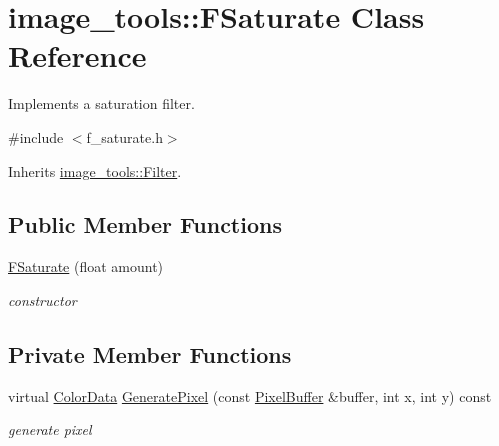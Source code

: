 \hypertarget{classimage__tools_1_1FSaturate}{}\section{image\+\_\+tools\+:\+:F\+Saturate Class Reference}
\label{classimage__tools_1_1FSaturate}


Implements a saturation filter.  




{\ttfamily \#include $<$f\+\_\+saturate.\+h$>$}



Inherits \hyperlink{classimage__tools_1_1Filter}{image\+\_\+tools\+::\+Filter}.

\subsection*{Public Member Functions}
\begin{DoxyCompactItemize}
\item 
\hyperlink{classimage__tools_1_1FSaturate_a5940def93bf1851091ae93e949a34b7d}{F\+Saturate} (float amount)\hypertarget{classimage__tools_1_1FSaturate_a5940def93bf1851091ae93e949a34b7d}{}\label{classimage__tools_1_1FSaturate_a5940def93bf1851091ae93e949a34b7d}

\begin{DoxyCompactList}\small\item\em constructor \end{DoxyCompactList}\end{DoxyCompactItemize}
\subsection*{Private Member Functions}
\begin{DoxyCompactItemize}
\item 
virtual \hyperlink{classimage__tools_1_1ColorData}{Color\+Data} \hyperlink{classimage__tools_1_1FSaturate_af576256575784ecbdf39109a0131e819}{Generate\+Pixel} (const \hyperlink{classimage__tools_1_1PixelBuffer}{Pixel\+Buffer} \&buffer, int x, int y) const \hypertarget{classimage__tools_1_1FSaturate_af576256575784ecbdf39109a0131e819}{}\label{classimage__tools_1_1FSaturate_af576256575784ecbdf39109a0131e819}

\begin{DoxyCompactList}\small\item\em generate pixel \end{DoxyCompactList}\end{DoxyCompactItemize}

